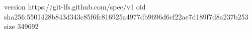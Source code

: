 version https://git-lfs.github.com/spec/v1
oid sha256:5501428b843d343c85f6fc816925a4977db9696d6cf22ae7d189f7d8a237b253
size 349692
